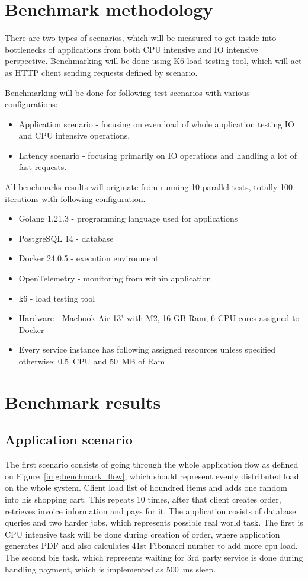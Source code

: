 
\section{Benchmark methodology}
There are two types of scenarios, which will be measured to get inside into bottlenecks of applications from both CPU intensive and IO intensive perspective. Benchmarking will be done using K6 load testing tool, which will act as HTTP client sending requests defined by scenario.

Benchmarking will be done for following test scenarios with various configurations:
\begin{itemize}
    \item Application scenario - focusing on even load of whole application testing IO and CPU intensive operations.
    \item Latency scenario - focusing primarily on IO operations and handling a lot of fast requests.
\end{itemize}

All benchmarks results will originate from running 10 parallel tests, totally 100 iterations with following configuration.
\begin{itemize}
    \item Golang 1.21.3 - programming language used for applications
    \item PostgreSQL 14 - database
    \item Docker 24.0.5 - execution environment
    \item OpenTelemetry - monitoring from within application
    \item k6 - load testing tool
    \item Hardware - Macbook Air 13" with M2, 16 GB Ram, 6 CPU cores assigned to Docker
    \item Every service instance has following assigned resources unless specified otherwise: 0.5~CPU and 50~MB of Ram
\end{itemize}


\section{Benchmark results}

\subsection{Application scenario}
The first scenario consists of going through the whole application flow as defined on Figure~\ref{img:benchmark_flow}, which should represent evenly distributed load on the whole system. Client load list of houndred items and adds one random into his shopping cart. This repeats 10 times, after that client creates order, retrieves invoice information and pays for it. The application cosists of database queries and two harder jobs, which represents possible real world task. The first is CPU intensive task will be done during creation of order, where application generates PDF and also calculates 41st Fibonacci number to add more cpu load. The second big task, which represents waiting for 3rd party service is done during handling payment, which is implemented as 500~ms sleep.

